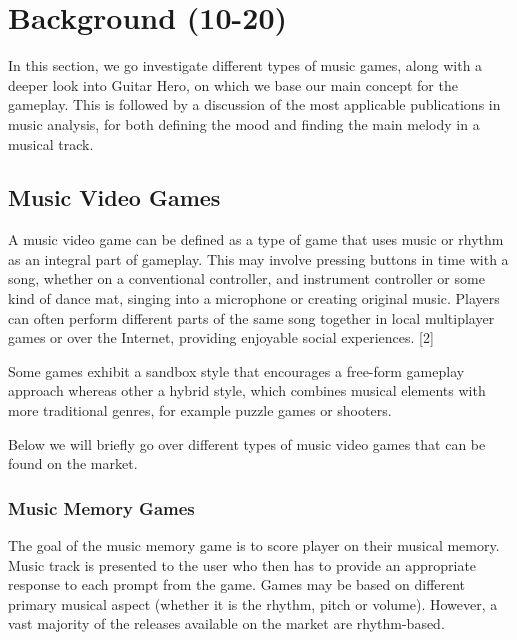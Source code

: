 
\chapter{Background (10-20)} %

\label{Chapter2} %



In this section, we go investigate different types of music games, along with a deeper look into Guitar Hero, on which we base our main concept for the gameplay. This is followed by a discussion of the most applicable publications in music analysis, for both defining the mood and finding the main melody in a musical track.


\section{Music Video Games }

A music video game can be defined as a type of game that uses music or rhythm as an integral part of gameplay. This may involve pressing buttons in time with a song, whether on a conventional controller, and instrument controller or some kind of dance mat, singing into a microphone or creating original music. Players can often perform different parts of the same song together in local multiplayer games or over the Internet, providing enjoyable social experiences. [2]

Some games exhibit a sandbox style that encourages a free-form gameplay approach whereas other a hybrid style, which combines musical elements with more traditional genres, for example puzzle games or shooters. 

Below we will briefly go over different types of music video games that can be found on the market.


\subsection{Music Memory Games}

The goal of the music memory game is to score player on their musical memory. Music track is presented to the user who then has to provide an appropriate response to each prompt from the game. Games may be based on different primary musical aspect (whether it is the rhythm, pitch or volume). However, a vast majority of the releases available on the market are rhythm-based.


